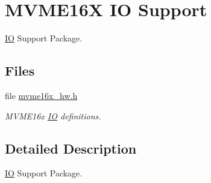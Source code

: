 \hypertarget{group__m68k__mvme}{}\section{M\+V\+M\+E16X IO Support}
\label{group__m68k__mvme}


\mbox{\hyperlink{structIO}{IO}} Support Package.  


\subsection*{Files}
\begin{DoxyCompactItemize}
\item 
file \mbox{\hyperlink{mvme16x__hw_8h}{mvme16x\+\_\+hw.\+h}}
\begin{DoxyCompactList}\small\item\em M\+V\+M\+E16x \mbox{\hyperlink{structIO}{IO}} definitions. \end{DoxyCompactList}\end{DoxyCompactItemize}


\subsection{Detailed Description}
\mbox{\hyperlink{structIO}{IO}} Support Package. 

